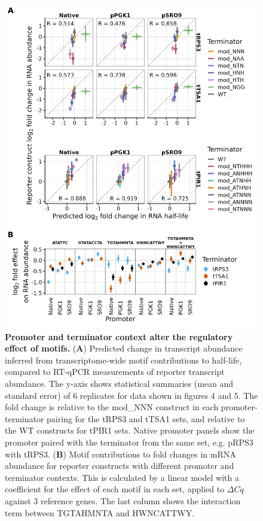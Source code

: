 \documentclass{SBCbookchapter}
\begin{document}
\begin{figure}[p]

{\centering \includegraphics[width=0.85\linewidth]{figures/qPCR_model_coef_and_pred_vs_exp_abund} 

}

\caption{\textbf{Promoter and terminator context alter the regulatory effect of motifs.} (\textbf{A}) Predicted change in transcript abundance inferred from transcriptome-wide motif contributions to half-life, compared to RT-qPCR measurements of reporter transcript abundance. The y-axis shows statistical summaries (mean and standard error) of 6 replicates for data shown in figures 4 and 5. The fold change is relative to the mod\_NNN construct in each promoter-terminator pairing for the tRPS3 and tTSA1 sets, and relative to the WT constructs for tPIR1 sets. Native promoter panels show the promoter paired with the terminator from the same set, e.g. pRPS3 with tRPS3. (\textbf{B}) Motif contributions to fold changes in mRNA abundance for reporter constructs with different promoter and terminator contexts. This is calculated by a linear model with a coefficient for the effect of each motif in each set, applied to $\Delta Cq$ against 3 reference genes. The last column shows the interaction term between TGTAHMNTA and HWNCATTWY.}\label{fig:hlife-predict-vs-abundance-and-motif-context-dependence}
\end{figure}
\end{document}
